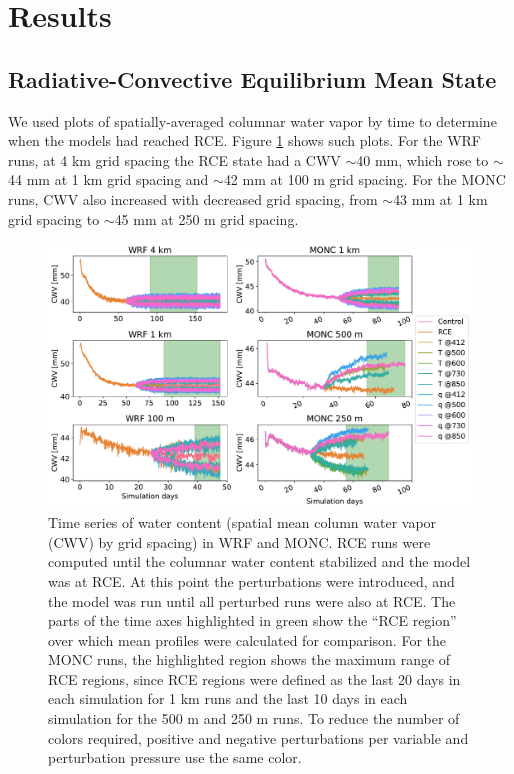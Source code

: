 \documentclass[draft]{agujournal2019}
\begin{document}
\section{Results}
\label{sec:results}

\subsection{Radiative-Convective Equilibrium Mean State}

We used plots of spatially-averaged columnar water vapor by time to determine
when the models had reached RCE. Figure \ref{fig:rce_pw} shows such plots. For
the WRF runs, at 4 km grid spacing the RCE state had a CWV $\sim$40 mm, which
rose to $\sim$44 mm at 1 km grid spacing and $\sim$42 mm at 100 m grid spacing.
For the MONC runs, CWV also increased with decreased grid spacing, from $\sim$43
mm at 1 km grid spacing to $\sim$45 mm at 250 m grid spacing.

\begin{figure}[pth]
    \noindent\includegraphics[width=\textwidth]{figures/runs_timeseries.pdf}
    \caption{Time series of water content (spatial mean column water vapor (CWV)
    by grid spacing) in WRF and MONC. RCE runs were computed until the columnar
    water content stabilized and the model was at RCE. At this point the
    perturbations were introduced, and the model was run until all perturbed
    runs were also at RCE. The parts of the time axes highlighted in green show
    the ``RCE region'' over which mean profiles were calculated for comparison.
    For the MONC runs, the highlighted region shows the maximum range of RCE
    regions, since RCE regions were defined as the last 20 days in each
    simulation for 1 km runs and the last 10 days in each simulation for the 500
    m and 250 m runs. To reduce the number of colors required, positive and
    negative perturbations per variable and perturbation pressure use the same
    color.}
    \label{fig:rce_pw}
\end{figure}
\end{document}
